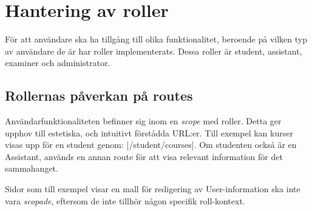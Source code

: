 \section{Hantering av roller}

För att användare ska ha tillgång till olika funktionalitet, beroende på vilken typ av användare de är har roller implementerats. Dessa roller är student, assistant, examiner och administrator.

\subsection{Rollernas påverkan på routes}
Användarfunktionaliteten befinner sig inom en \emph{scope} med roller. Detta ger upphov till estetiska, och intuitivt förstådda URL:er. Till exempel kan kurser visas upp för en student genom: |/student/courses|. Om studenten också är en Assistant, används en annan route för att visa relevant information för det sammahanget.

Sidor som till exempel visar en mall för redigering av User-information ska inte vara \emph{scopade}, eftersom de inte tillhör någon specifik roll-kontext.

